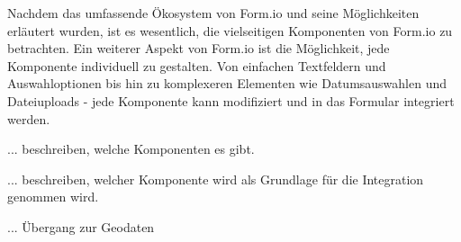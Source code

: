 Nachdem das umfassende Ökosystem von Form.io und seine Möglichkeiten erläutert wurden, ist es wesentlich, die vielseitigen Komponenten von Form.io zu betrachten. Ein weiterer Aspekt von Form.io ist die Möglichkeit, jede Komponente individuell zu gestalten. Von einfachen Textfeldern und Auswahloptionen bis hin zu komplexeren Elementen wie Datumsauswahlen und Dateiuploads - jede Komponente kann modifiziert und in das Formular integriert werden.

... beschreiben, welche Komponenten es gibt.

... beschreiben, welcher Komponente wird als Grundlage für die Integration genommen wird.

... Übergang zur Geodaten










